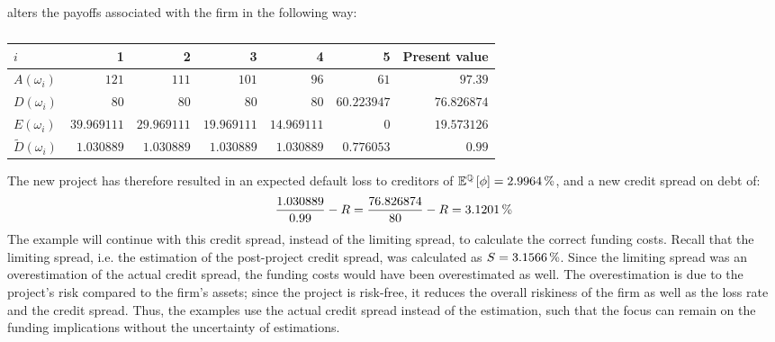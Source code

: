 \documentclass[main.tex]{subfiles}
\begin{document}
        alters the payoffs associated with the firm in the following way:
        \begin{table}[H]
            \centering
            \begin{tabular}{l|rrrrr||r}
                $i$ & 1 & 2 & 3 & 4 & 5 & Present value \\
                \hline
                $A(\omega_{i})$ 
                    & $\num{121}$ & $\num{111}$ & $\num{101}$ & $\num{96}$ & $\num{61}$ & $\num{97.39}$ \\
                $D(\omega_{i})$ 
                    & $\num{80}$ & $\num{80}$ & $\num{80}$ & $\num{80}$ & $\num{60.223947}$ & $\num{76.826874}$ \\
                $E(\omega_{i})$ 
                    & $\num{39.969111}$ & $\num{29.969111}$ & $\num{19.969111}$ & $\num{14.969111}$ & $\num{0}$ & $\num{19.573126}$ \\
                $\tilde{D}(\omega_{i})$ 
                    & $\num{1.030889}$ & $\num{1.030889}$ & $\num{1.030889}$ & $\num{1.030889}$ & $\num{0.776053}$ & $\num{0.99}$ \\
            \end{tabular}
            \caption{}
        \end{table}

        The new project has therefore resulted in an expected default loss to creditors of 
        $\mathbb{E}^{\rnmeasure}\left[\phi\right] = \pct{0.029964}$,
        and a new credit spread on debt of:
        \begin{equation}
            \frac{
                1.030889
            }{    
                0.99
            } 
            -
            R
            = 
            \frac{
                76.826874
            }{    
                80
            } 
            -
            R
            =
            \pct{0.031201}
        \end{equation}
        The example will continue with this credit spread, instead of the limiting spread,
        to calculate the correct funding costs.
        Recall that the limiting spread, i.e. the estimation of the post-project credit spread, 
        was calculated as $S = \pct{0.031566}$.
        Since the limiting spread was an overestimation of the actual credit spread,
        the funding costs would have been overestimated as well.
        The overestimation is due to the project's risk compared to the firm's assets;
        since the project is risk-free, it reduces the overall riskiness of the firm
        as well as the loss rate and the credit spread.
        Thus, the examples use the actual credit spread instead of the estimation, 
        such that the focus can remain on the funding implications
        without the uncertainty of estimations.
\end{document}

